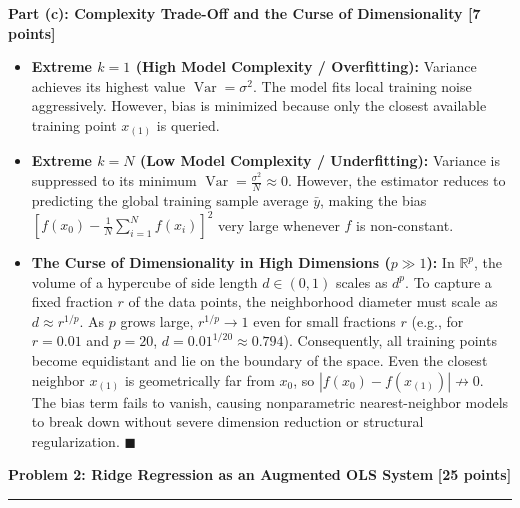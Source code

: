 \documentclass[11pt,a4paper]{article}
\newcommand{\problemheader}[2]{%
  \noindent
  \begin{minipage}{\textwidth}
    {\large\bfseries\textcolor{utblue}{#1}}\hfill
    {\large\bfseries\textcolor{utblue}{#2}}\\[3pt]
    \textcolor{utblue}{\rule{\textwidth}{1pt}}
  \end{minipage}%
  \par\vspace{8pt}
}
\begin{document}
\vspace{4pt}
\textbf{Part (c): Complexity Trade-Off and the Curse of Dimensionality [7 points]} \\
\begin{itemize}[itemsep=3pt, leftmargin=18pt]
  \item \textbf{Extreme $k = 1$ (High Model Complexity / Overfitting):}
  Variance achieves its highest value $\operatorname{Var} = \sigma^2$. The model fits local training noise aggressively. However, bias is minimized because only the closest available training point $x_{(1)}$ is queried.
  \item \textbf{Extreme $k = N$ (Low Model Complexity / Underfitting):}
  Variance is suppressed to its minimum $\operatorname{Var} = \frac{\sigma^2}{N} \approx 0$. However, the estimator reduces to predicting the global training sample average $\bar{y}$, making the bias $\left[ f(x_0) - \frac{1}{N}\sum_{i=1}^N f(x_i) \right]^2$ very large whenever $f$ is non-constant.
  \item \textbf{The Curse of Dimensionality in High Dimensions ($p \gg 1$):}
  In $\mathbb{R}^p$, the volume of a hypercube of side length $d \in (0, 1)$ scales as $d^p$. To capture a fixed fraction $r$ of the data points, the neighborhood diameter must scale as $d \approx r^{1/p}$. As $p$ grows large, $r^{1/p} \to 1$ even for small fractions $r$ (e.g., for $r = 0.01$ and $p = 20$, $d = 0.01^{1/20} \approx 0.794$). Consequently, all training points become equidistant and lie on the boundary of the space. Even the closest neighbor $x_{(1)}$ is geometrically far from $x_0$, so $|f(x_0) - f(x_{(1)})| \not\to 0$. The bias term fails to vanish, causing nonparametric nearest-neighbor models to break down without severe dimension reduction or structural regularization. $\blacksquare$
\end{itemize}

\vspace{22pt}

\problemheader{Problem 2: Ridge Regression as an Augmented OLS System}{[25 points]}
\end{document}
